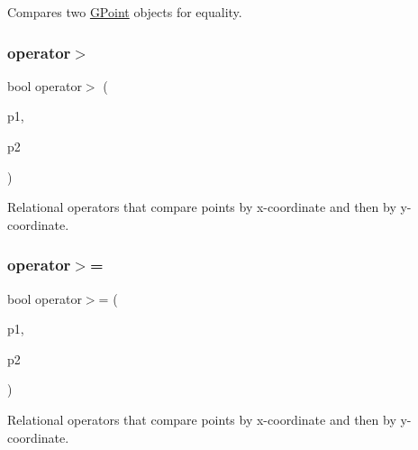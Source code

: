 Compares two \mbox{\hyperlink{classGPoint}{G\+Point}} objects for equality. 

\mbox{\label{classGPoint_a2ef77d4bff099bb0440be3bde3341bd1}} 
\subsubsection{\texorpdfstring{operator$>$}{operator>}}
{\footnotesize\ttfamily bool operator$>$ (\begin{DoxyParamCaption}\item[{const \mbox{\hyperlink{classGPoint}{G\+Point}} \&}]{p1,  }\item[{const \mbox{\hyperlink{classGPoint}{G\+Point}} \&}]{p2 }\end{DoxyParamCaption})\hspace{0.3cm}{\ttfamily [friend]}}



Relational operators that compare points by x-\/coordinate and then by y-\/coordinate. 

\mbox{\label{classGPoint_a0f6d51aeb0175e5c7ae32b43f732a742}} 
\subsubsection{\texorpdfstring{operator$>$=}{operator>=}}
{\footnotesize\ttfamily bool operator$>$= (\begin{DoxyParamCaption}\item[{const \mbox{\hyperlink{classGPoint}{G\+Point}} \&}]{p1,  }\item[{const \mbox{\hyperlink{classGPoint}{G\+Point}} \&}]{p2 }\end{DoxyParamCaption})\hspace{0.3cm}{\ttfamily [friend]}}



Relational operators that compare points by x-\/coordinate and then by y-\/coordinate. 


